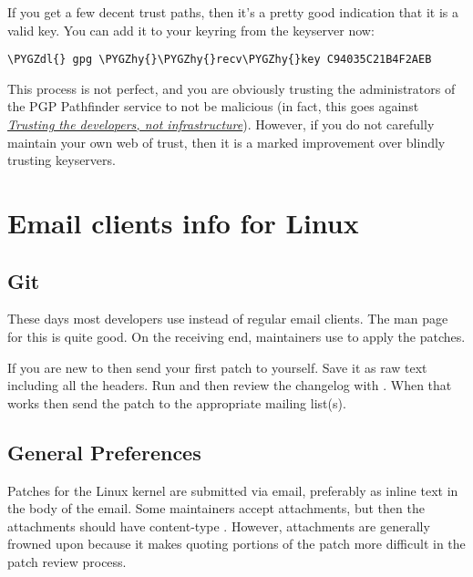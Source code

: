 \documentclass[a4paper,8pt,english]{sphinxmanual}
\def\PYGZdl{\char`\$}
\def\PYGZhy{\char`\-}
\begin{document}
If you get a few decent trust paths, then it's a pretty good indication
that it is a valid key. You can add it to your keyring from the
keyserver now:

\begin{Verbatim}[commandchars=\\\{\}]
\PYGZdl{} gpg \PYGZhy{}\PYGZhy{}recv\PYGZhy{}key C94035C21B4F2AEB
\end{Verbatim}

This process is not perfect, and you are obviously trusting the
administrators of the PGP Pathfinder service to not be malicious (in
fact, this goes against {\hyperref[process/maintainer\string-pgp\string-guide:devs\string-not\string-infra]{\emph{Trusting the developers, not infrastructure}}}). However, if you
do not carefully maintain your own web of trust, then it is a marked
improvement over blindly trusting keyservers.


\chapter{Email clients info for Linux}
\label{process/email-clients:email-clients-info-for-linux}\label{process/email-clients::doc}\label{process/email-clients:email-clients}\label{process/email-clients:finding-paths-to-linus}

\section{Git}
\label{process/email-clients:git}
These days most developers use  instead of regular
email clients.  The man page for this is quite good.  On the receiving
end, maintainers use  to apply the patches.

If you are new to  then send your first patch to yourself.  Save it
as raw text including all the headers.  Run  and
then review the changelog with .  When that works then send
the patch to the appropriate mailing list(s).


\section{General Preferences}
\label{process/email-clients:general-preferences}
Patches for the Linux kernel are submitted via email, preferably as
inline text in the body of the email.  Some maintainers accept
attachments, but then the attachments should have content-type
.  However, attachments are generally frowned upon because
it makes quoting portions of the patch more difficult in the patch
review process.
\end{document}

